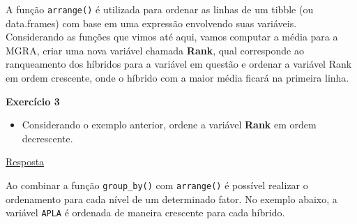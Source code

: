\documentclass[
]{book}
\newenvironment{Shaded}{\begin{snugshade}}{\end{snugshade}}
\newcommand{\CommentTok}[1]{\textcolor[rgb]{0.56,0.35,0.01}{\textit{#1}}}
\newcommand{\DataTypeTok}[1]{\textcolor[rgb]{0.13,0.29,0.53}{#1}}
\newcommand{\KeywordTok}[1]{\textcolor[rgb]{0.13,0.29,0.53}{\textbf{#1}}}
\newcommand{\NormalTok}[1]{#1}
\newcommand{\OperatorTok}[1]{\textcolor[rgb]{0.81,0.36,0.00}{\textbf{#1}}}
\newcommand{\StringTok}[1]{\textcolor[rgb]{0.31,0.60,0.02}{#1}}
\providecommand{\tightlist}{%
  \setlength{\itemsep}{0pt}\setlength{\parskip}{0pt}}
\begin{document}
A função \texttt{arrange()}  é utilizada para ordenar as linhas de um tibble (ou data.frames) com base em uma expressão envolvendo suas variáveis. Considerando as funções que vimos até aqui, vamos computar a média para a MGRA, criar uma nova variável chamada \textbf{Rank}, qual corresponde ao ranqueamento dos híbridos para a variável em questão e ordenar a variável Rank em ordem crescente, onde o híbrido com a maior média ficará na primeira linha.

\begin{Shaded}
\end{Shaded}


\begin{tarefa}
\textbf{Exercício 3}

\begin{itemize}
\tightlist
\item
  Considerando o exemplo anterior, ordene a variável \textbf{Rank} em ordem decrescente.
\end{itemize}
\end{tarefa}

\protect\hyperlink{exerc3}{Resposta}

Ao combinar a função \texttt{group\_by()} com \texttt{arrange()} é possível realizar o ordenamento para cada nível de um determinado fator. No exemplo abaixo, a variável \texttt{APLA} é ordenada de maneira crescente para cada híbrido.
\end{document}
